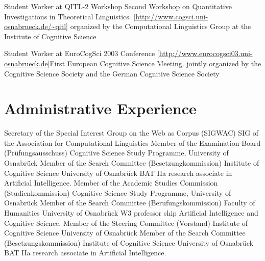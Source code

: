 \documentclass[11pt,a4paper]{moderncv}
\begin{document}
        {Student Worker at QITL-2}
        {Workshop}
        {Second Workshop on Quantitative Investigations in Theoretical
        Linguistics.}
        {[\url{http://www.cogsci.uni-osnabrueck.de/~qitl}]}
        {organized by the Computational Linguistics Group at the Institute of
        Cognitive Science}

        {Student Worker at EuroCogSci 2003}
        {Conference}
        {[\url{http://www.eurocogsci03.uni-osnabrueck.de}]}{First European
        Cognitive Science Meeting.}
        {jointly organized by the Cognitive Science Society and the German
        Cognitive Science Society}
\closesection{}


\section{Administrative Experience}
        {Secretary of the Special Interest Group on the Web as Corpus (SIGWAC)}
        {}
        {SIG of the Association for Computational Linguistics}
        {}
        {}
        {Member of the Examination Board (Pr\"{u}fungsausschuss)}
        {}
        {Cognitive Science Study Programme, University of Osnabr\"{u}ck}
        {}
        {}
        {Member of the Search Committee (Besetzungkommission)}
        {}
        {Institute of Cognitive Science}
        {University of Osnabr\"{u}ck}
        {BAT IIa research associate in Artificial Intelligence.}
        {Member of the Academic Studies Commission (Studienkommission)}
        {}
        {Cognitive Science Study Programme, University of Osnabr\"{u}ck}
        {}
        {}
        {Member of the Search Committee (Berufungskommission)}
        {}
        {Faculty of Humanities}
        {University of Osnabr\"{u}ck}
        {W3 professor ship Artificial Intelligence and Cognitive Science.}
        {Member of the Steering Committee (Vorstand)}
        {}
        {Institute of Cognitive Science}
        {University of Osnabr\"{u}ck}
        {}
        {Member of the Search Committee (Besetzungskommission)}
        {}
        {Institute of Cognitive Science}
        {University of Osnabr\"{u}ck}
        {BAT IIa research associate in Artificial Intelligence.}
\closesection{}
\end{document}
